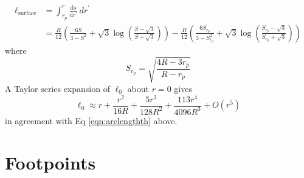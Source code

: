\documentclass{book}
\newcommand{\deriv}[2]{\frac{\text{d}{#1}}{\text{d}{#2}}}
\begin{document}
\begin{equation}
    \begin{aligned}
        \ell_\text{surface} &= \int_{r_p}^r \deriv{s}{r^\prime} \,dr^\prime \\
               &= \frac{R}{12}\left(\frac{6S}{3 - S^2} + \sqrt{3}\log\left(\frac{S - \sqrt{3}}{S + \sqrt{3}}\right)\right) -
                  \frac{R}{12}\left(\frac{6S_{r_p}}{3 - S_{r_p}^2} + \sqrt{3}\log\left(\frac{S_{r_p} -
                  \sqrt{3}}{S_{r_p} + \sqrt{3}}\right)\right)
     \end{aligned}
\end{equation}
where
\begin{equation}
    S_{r_p} = \sqrt{\frac{4R-3r_p}{R-r_p}}
\end{equation}
A Taylor series expansion of $\ell_0$ about $r=0$ gives
\begin{equation}
    \ell_0 \approx r + \frac{r^2}{16R} + \frac{5r^3}{128R^2} + \frac{113r^4}{4096R^3} + O(r^5)
\end{equation}
in agreement with Eq \eqref{eqn:arclengthth} above.

\section{Footpoints}
\label{sec:footpoints}
\end{document}
